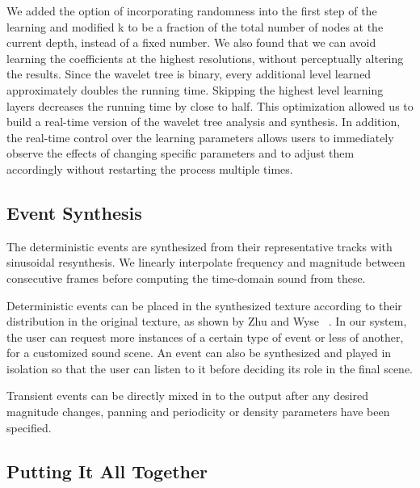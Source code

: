 \documentclass{acmsiggraph}               %
\begin{document}
We added the option of incorporating randomness into the first step of 
the learning and modified k to be a fraction of the total number of 
nodes at the current depth, instead of a fixed number. We also found 
that we can avoid learning the coefficients at the highest resolutions, 
without perceptually altering the results. Since the wavelet tree is binary, every additional 
level learned approximately doubles the running time. Skipping the highest level learning
layers decreases the running time by close to half. 
This optimization allowed us to build a real-time version of the wavelet tree analysis and synthesis. 
In addition, the real-time control over the learning parameters allows 
users to immediately observe the effects of changing specific parameters 
and to adjust them accordingly without restarting the process multiple times.


\subsection{Event Synthesis}

The deterministic events are synthesized from their representative tracks with 
sinusoidal resynthesis. We linearly interpolate frequency and magnitude 
between consecutive frames before computing the time-domain sound from 
these. 

Deterministic events can be placed in the synthesized texture according to their 
distribution in the original texture, as shown by Zhu and Wyse 
~. In our system, the user can request more instances of a 
certain type of event or less of another, for a customized sound 
scene. 
An event can also be 
synthesized and played in isolation so that the user can listen to it 
before deciding its role in the final scene.

Transient events can be directly mixed in to the output after any 
desired magnitude changes, panning and periodicity or density parameters 
have been specified. 


\subsection{Putting It All Together}
\end{document}
